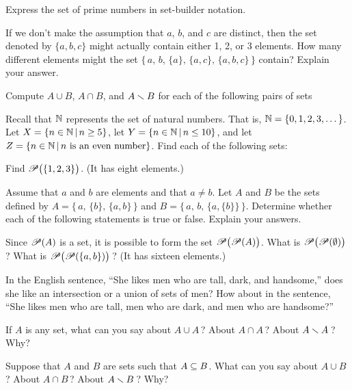 
\begin{exercises}
\problem Express the set of prime numbers in set-builder notation.

\problem If we don't make the assumption that $a$, $b$, and $c$ are distinct,
then the set denoted by $\{a,b,c\}$ might actually contain either 1, 2, or 3 
elements.  How many different elements might the set
$\{\,a,\,b,\,\{a\},\,\{a,c\},\,\{a,b,c\}\,\}$
contain?  Explain your answer.

\problem Compute $A\cup B$, $A\cap B$, and $A\smallsetminus B$ for each of the following
pairs of sets

\problem Recall that ${\mathbb N}$ represents the set of natural numbers.  That is,
${\mathbb N}=\{0,1,2,3,\dots\}$.  Let $X=\{n\in{\mathbb N}\,|\, n\ge 5\}$,
let $Y=\{n\in{\mathbb N}\,|\, n\le10\}$, and let $Z=\{n\in{\mathbb N}\,|\, \text{$n$ is an even number}\}$.
Find each of the following sets:


\problem Find ${\mathscr P}\big(\{1,2,3\}\big)$. (It has eight elements.)

\problem Assume that $a$ and $b$ are elements and that $a\not=b$. Let $A$ and $B$ be the sets defined by
$A=\{\,a,\,\{b\},\,\{a,b\}\,\}$ and $B=\{\,a,\,b,\,\{a,\{b\}\}\,\}$.
Determine whether each of the following statements is true or false.  Explain
your answers.

\problem Since ${\mathscr P}(A)$ is a set, it is possible to form the set
${\mathscr P}\big({\mathscr P}(A)\big)$.  What is ${\mathscr P}\big({\mathscr P}(\emptyset)\big)\,$?
What is ${\mathscr P}\big({\mathscr P}(\{a,b\})\big)\,$? (It has sixteen elements.)

\problem In the English sentence, ``She likes men who are tall, dark, and
handsome,'' does she like an intersection or a union of sets of men?
How about in the sentence, ``She likes men who are tall, men who are dark,
and men who are handsome?''

\problem If $A$ is any set, what can you say about $A\cup A\,$?
About $A\cap A\,$?  About $A\smallsetminus A\,$?  Why?

\problem Suppose that $A$ and $B$ are sets such that $A\subseteq B$.
What can you say about $A\cup B\,$?  About $A\cap B\,$?
About $A\smallsetminus B\,$?  Why?


\end{exercises}
